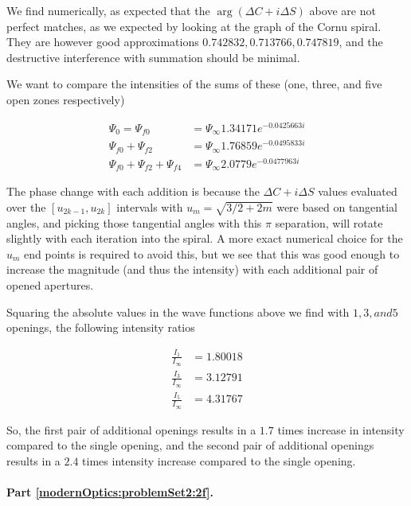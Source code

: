 {We find numerically, as expected that the $\arg(\Delta C + i \Delta S)$ above are not perfect matches, as we expected by looking at the graph of the Cornu spiral.  They are however good approximations $0.742832, 0.713766, 0.747819$, and the destructive interference with summation should be minimal.

We want to compare the intensities of the sums of these (one, three, and five open zones respectively)

\begin{equation}\label{eqn:modernOptics:ProblemSet2:P2:200}
\begin{aligned}
\Psi_0 = \Psi_{f0} &= \Psi_\infty 1.34171 e^{ -0.0425663 i } \\
\Psi_{f0} + \Psi_{f2} &= \Psi_\infty 1.76859 e^{ -0.0495833 i } \\
\Psi_{f0} + \Psi_{f2} + \Psi_{f4} &= \Psi_\infty 2.0779 e^{ -0.0477963 i }
\end{aligned}
\end{equation}

The phase change with each addition is because the $\Delta C + i \Delta S$ values evaluated over the $[u_{2k-1}, u_{2k}]$ intervals with $u_m = \sqrt{3/2 + 2m}$ were based on tangential angles, and picking those tangential angles with this $\pi$ separation, will rotate slightly with each iteration into the spiral.  A more exact numerical choice for the $u_m$ end points is required to avoid this, but we see that this was good enough to increase the magnitude (and thus the intensity) with each additional pair of opened apertures.

Squaring the absolute values in the wave functions above we find with $1, 3, and 5$ openings, the following intensity ratios

\begin{equation}\label{eqn:modernOptics:ProblemSet2:P2:220}
\begin{aligned}
\frac{I_{1}}{I_\infty} &= 1.80018 \\
\frac{I_{3}}{I_\infty} &= 3.12791 \\
\frac{I_{5}}{I_\infty} &= 4.31767
\end{aligned}
\end{equation}

So, the first pair of additional openings results in a $1.7$ times increase in intensity compared to the single opening, and the second pair of additional openings results in a $2.4$ times intensity increase compared to the single opening.

\paragraph{Part \ref{modernOptics:problemSet2:2f}.  }

}

